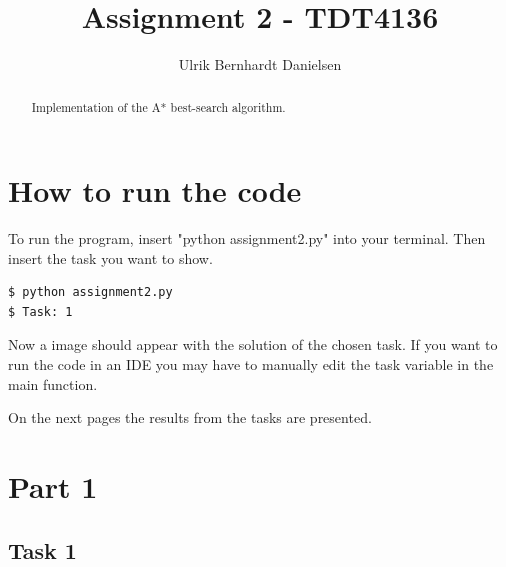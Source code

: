 \documentclass{article}
\begin{document}
\title{Assignment 2 - TDT4136}
\author{Ulrik Bernhardt Danielsen}

\maketitle

\begin{abstract}
Implementation of the A* best-search algorithm.
\end{abstract}

\section{How to run the code}
To run the program, insert "python assignment2.py" into your terminal. Then insert the task you want to show.
\begin{verbatim}
$ python assignment2.py
$ Task: 1
\end{verbatim}
\noindent
Now a image should appear with the solution of the chosen task. If you want to run the code in an IDE you may have to manually edit the task variable in the main function.

On the next pages the results from the tasks are presented.
\newpage

\section{Part 1}
\subsection{Task 1}
\end{document}
